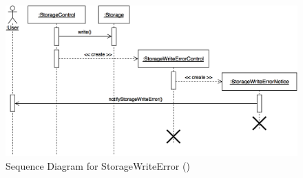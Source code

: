 \documentclass[12pt,letterpaper]{article}
\begin{document}
\begin{figure}[H]
	\centering{}
	\includegraphics[scale=0.27]{imgs/seq/storage-write-error.png}
	\caption[ - Sequence Diagram for StorageWriteError]{Sequence Diagram for StorageWriteError ()}
\end{figure}
\end{document}
